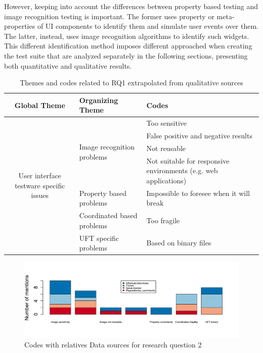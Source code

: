 However, keeping into account the differences between property based testing and image recognition testing is important. The former uses property or meta-properties of UI components to identify them and simulate user events over them. The latter, instead, uses image recognition algorithms to identify such widgets. This different identification method imposes different approached when creating the test suite that are analyzed separately in the following sections, presenting both quantitative and qualitative results.


  
\begin{table}
\renewcommand{\arraystretch}{1.5}
\centering
\begin{tabular}{ c p{4.3cm} p{4.6cm}}
    
    \hline       
    {\large Global Theme} & {\large Organizing Theme} & {\large Codes}\\
    \hline
    
    \multirow{7}{*}{\parbox[b]{4.3cm}{
        User interface testware specific issues
    }
    } & \multirow{4}{*}{\parbox[c]{4.3cm}{Image recognition problems}}
        & Too sensitive \\
        & & False positive and negative results\\
        & & Not reusable\\ 
        & & Not suitable for responsive environments (e.g. web applications)\\ \cline{2-3}
        
    & Property based problems & Impossible to foresee when it will break\\ \cline{2-3}
        
    & Coordinated based problems  & Too fragile\\ \cline{2-3}
        
    & UFT specific problems & Based on binary files\\
        
    \hline
\end{tabular}
\caption{Themes and codes related to RQ1 extrapolated from qualitative sources}
\label{tab:themes_rq2}
\end{table}

\begin{figure}[!htbp]
    \centering
    \includegraphics[width=\textwidth,keepaspectratio]{figure/results/rq2/sources.pdf}
    \caption{Codes with relatives Data sources for research question 2}
    \label{fig:rq2_sources}
\end{figure}



